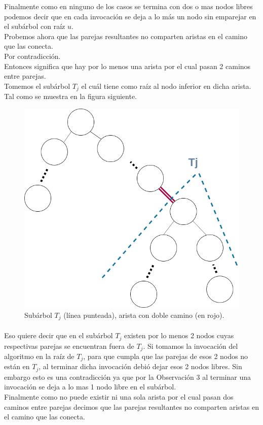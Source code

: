 \documentclass[12pt]{article}
\begin{document}
Finalmente como en ninguno de los casos se termina con dos o mas nodos libres podemos decir que en cada invocación se deja a lo más un nodo sin emparejar  en el subárbol con raíz $u$.\\
Probemos ahora que las parejas resultantes no comparten aristas en el camino que las conecta.\\
Por contradicción.\\
Entonces significa que hay por lo menos una arista por el cual pasan 2 caminos entre parejas. \\
Tomemos el subárbol $T_j$ el cuál tiene como raíz al nodo inferior en dicha arista. Tal como se muestra en la figura siguiente.\\
\begin{figure}[h]
\begin{center}
\includegraphics[scale=0.5]{ARBOL}
	\end{center}
\caption{Subárbol $T_j$ (línea punteada), arista con doble camino (en rojo).}
\end{figure}
\pagebreak
\paragraph{} Eso quiere decir que en el subárbol $T_j$ existen por lo menos 2 nodos cuyas respectivas parejas se encuentran fuera de $T_j$. Si tomamos la invocación del algoritmo en la raíz de $T_j$, para que cumpla que las parejas de esos 2 nodos no están en $T_j$, al terminar dicha invocación debió dejar esos 2 nodos libres. Sin embargo esto es una contradicción ya que por la Observación 3 al terminar una invocación se deja a lo mas 1 nodo libre en el subárbol.\\
Finalmente como no puede existir ni una sola arista por el cual pasan dos caminos entre parejas decimos que  las parejas resultantes no comparten aristas en el camino que las conecta.\\
\end{document}
